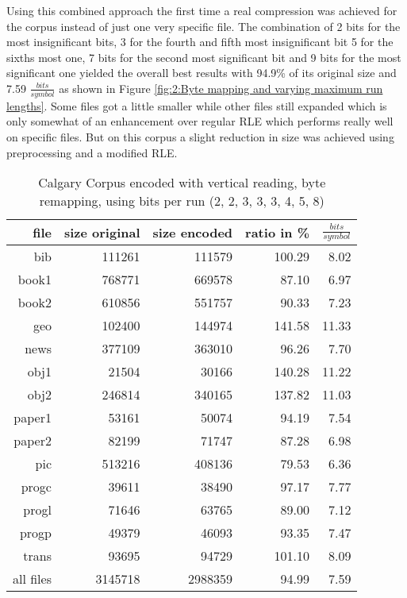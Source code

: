 \par{
Using this combined approach the first time a real compression was achieved for the corpus instead of just one very specific file. The combination of 2 bits for the most insignificant bits, 3 for the fourth and fifth most insignificant bit 5 for the sixths most one, 7 bits for the second most significant bit and 9 bits for the most significant one yielded the overall best results with 94.9\% of its original size and 7.59 $\frac{bits}{symbol}$ as shown in Figure \ref{fig:2:Byte mapping and varying maximum run lengths}. Some files got a little smaller while other files still expanded which is only somewhat of an enhancement over regular RLE which performs really well on specific files. But on this corpus a slight reduction in size was achieved using preprocessing and a modified RLE.
\begin{table}[H]
	\centering
	\begin{tabular}{r|r|r|r|r}	
		file & size original & size encoded & ratio in \% & $\frac{bits}{symbol}$\\
		\hline
bib & 111261 & 111579 & 100.29 & 8.02 \\
book1 & 768771 & 669578 & 87.10 & 6.97 \\
book2 & 610856 & 551757 & 90.33 & 7.23 \\
geo & 102400 & 144974 & 141.58 & 11.33 \\
news & 377109 & 363010 & 96.26 & 7.70 \\
obj1 & 21504 & 30166 & 140.28 & 11.22 \\
obj2 & 246814 & 340165 & 137.82 & 11.03 \\
paper1 & 53161 & 50074 & 94.19 & 7.54 \\
paper2 & 82199 & 71747 & 87.28 & 6.98 \\
pic & 513216 & 408136 & 79.53 & 6.36 \\
progc & 39611 & 38490 & 97.17 & 7.77 \\
progl & 71646 & 63765 & 89.00 & 7.12 \\
progp & 49379 & 46093 & 93.35 & 7.47 \\
trans & 93695 & 94729 & 101.10 & 8.09 \\
		\hline
		all files & 3145718 & 2988359 & 94.99 & 7.59
	\end{tabular}
	\caption{Calgary Corpus encoded with vertical reading, byte remapping, using bits per run (2, 2, 3, 3, 3, 4, 5, 8)}
\label{tab:t43 Calgary Corpus encoded with vertical reading, byte remapping and varying bits per run}
\end{table}
}


